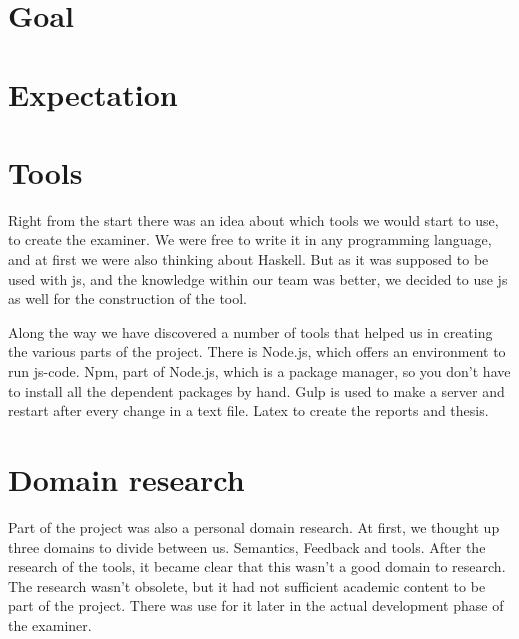 \section{Goal}


\section{Expectation}


\section{Tools}

Right from the start there was an idea about which tools we would start to use, to create the examiner. We were free to write it in any programming language, and
at first we were also thinking about Haskell.
But as it was supposed to be used with \gls{js}, and the knowledge within our
team was better, we decided to use \gls{js} as well for the construction of the tool. 

Along the way we have discovered a number of tools that helped us in creating the various parts of the project.
There is Node.js, which offers an environment to run \gls{js-code}.
Npm, part of Node.js, which is a package manager, so you don't have to install
all the dependent packages by hand.
Gulp is used to make a server and restart after every change in a text file.
Latex to create the reports and thesis.


\section{Domain research}
Part of the project was also a personal domain research. At first, we thought up
three domains to divide between us.
Semantics, Feedback and tools.
After the research of the tools, it became clear that this wasn't a good domain
to research.
The research wasn't obsolete, but it had not sufficient academic content to be
part of the project.
There was use for it later in the actual development phase of the \gls{examiner}.
